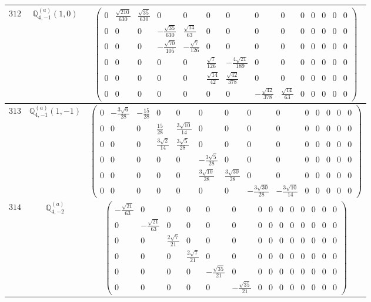\documentclass[fleqn,8pt,landscape]{jsarticle}
\begin{document}
\begin{center}
\begin{longtable}{ccc}
$ 312 $ & $ \mathbb{Q}_{4,-1}^{(a)}(1,0) $ & $ \begin{pmatrix} 0 & \frac{\sqrt{210}}{630} & \frac{\sqrt{35}}{630} & 0 & 0 & 0 & 0 & 0 & 0 & 0 & 0 & 0 & 0 & 0 \\ 0 & 0 & 0 & - \frac{\sqrt{35}}{630} & \frac{\sqrt{14}}{63} & 0 & 0 & 0 & 0 & 0 & 0 & 0 & 0 & 0 \\ 0 & 0 & 0 & - \frac{\sqrt{70}}{105} & - \frac{\sqrt{7}}{126} & 0 & 0 & 0 & 0 & 0 & 0 & 0 & 0 & 0 \\ 0 & 0 & 0 & 0 & 0 & \frac{\sqrt{7}}{126} & - \frac{4 \sqrt{21}}{189} & 0 & 0 & 0 & 0 & 0 & 0 & 0 \\ 0 & 0 & 0 & 0 & 0 & \frac{\sqrt{14}}{42} & \frac{\sqrt{42}}{378} & 0 & 0 & 0 & 0 & 0 & 0 & 0 \\ 0 & 0 & 0 & 0 & 0 & 0 & 0 & - \frac{\sqrt{42}}{378} & \frac{\sqrt{14}}{63} & 0 & 0 & 0 & 0 & 0 \end{pmatrix} $ \\ \hline
$ 313 $ & $ \mathbb{Q}_{4,-1}^{(a)}(1,-1) $ & $ \begin{pmatrix} 0 & - \frac{3 \sqrt{6}}{28} & - \frac{15}{28} & 0 & 0 & 0 & 0 & 0 & 0 & 0 & 0 & 0 & 0 & 0 \\ 0 & 0 & 0 & \frac{15}{28} & \frac{3 \sqrt{10}}{14} & 0 & 0 & 0 & 0 & 0 & 0 & 0 & 0 & 0 \\ 0 & 0 & 0 & \frac{3 \sqrt{2}}{14} & \frac{3 \sqrt{5}}{28} & 0 & 0 & 0 & 0 & 0 & 0 & 0 & 0 & 0 \\ 0 & 0 & 0 & 0 & 0 & - \frac{3 \sqrt{5}}{28} & 0 & 0 & 0 & 0 & 0 & 0 & 0 & 0 \\ 0 & 0 & 0 & 0 & 0 & \frac{3 \sqrt{10}}{28} & \frac{3 \sqrt{30}}{28} & 0 & 0 & 0 & 0 & 0 & 0 & 0 \\ 0 & 0 & 0 & 0 & 0 & 0 & 0 & - \frac{3 \sqrt{30}}{28} & - \frac{3 \sqrt{10}}{14} & 0 & 0 & 0 & 0 & 0 \end{pmatrix} $ \\ \hline
$ 314 $ & $ \mathbb{Q}_{4,-2}^{(a)} $ & $ \begin{pmatrix} - \frac{\sqrt{21}}{63} & 0 & 0 & 0 & 0 & 0 & 0 & 0 & 0 & 0 & 0 & 0 & 0 & 0 \\ 0 & - \frac{\sqrt{21}}{63} & 0 & 0 & 0 & 0 & 0 & 0 & 0 & 0 & 0 & 0 & 0 & 0 \\ 0 & 0 & \frac{2 \sqrt{7}}{21} & 0 & 0 & 0 & 0 & 0 & 0 & 0 & 0 & 0 & 0 & 0 \\ 0 & 0 & 0 & \frac{2 \sqrt{7}}{21} & 0 & 0 & 0 & 0 & 0 & 0 & 0 & 0 & 0 & 0 \\ 0 & 0 & 0 & 0 & - \frac{\sqrt{35}}{21} & 0 & 0 & 0 & 0 & 0 & 0 & 0 & 0 & 0 \\ 0 & 0 & 0 & 0 & 0 & - \frac{\sqrt{35}}{21} & 0 & 0 & 0 & 0 & 0 & 0 & 0 & 0 \end{pmatrix} $ \\ \hline

\end{longtable}
\end{center}
\end{document}
